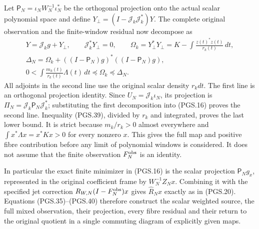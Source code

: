 Let \(\mathsf P_N=\iota_NW_N^{-1}\iota_N^*\) be the orthogonal
projection onto the actual scalar polynomial space and define
\(Y_\perp=(I-\mathscr J_k\mathscr J_k^*)Y\). The complete
original observation and the finite-window residual now decompose as
\[
\begin{gathered}
 Y=\mathscr J_kg+Y_\perp,\qquad
 \mathscr J_k^*Y_\perp=0,\qquad
 \Omega_k=Y_\perp^*Y_\perp
      =K-\int\frac{z(t)^*z(t)}{r_k(t)}\,dt,\\
 \Delta_N=\Omega_k+
       ((I-\mathsf P_N)g)^*((I-\mathsf P_N)g),\\
 0<\int\frac{m_k(t)}{r_k(t)}\Lambda(t)\,dt
                  \preceq\Omega_k\preceq\Delta_N.
\end{gathered}
\tag{PGS.40}\label{eq:pgs-fibre-residual}
\]
All adjoints in the second line use the original scalar density
\(r_kdt\). The first line is an orthogonal projection identity.
Since \(U_N=\mathscr J_k\iota_N\), its projection is
\(\Pi_N=\mathscr J_k\mathsf P_N\mathscr J_k^*\); substituting
the first decomposition into (PGS.16) proves the second line.
Inequality (PGS.39), divided by \(r_k\) and integrated, proves
the last lower bound. It is strict because \(m_k/r_k>0\)
almost everywhere and
\(\int x^*\Lambda x=x^*Kx>0\) for every nonzero \(x\).
This gives the full map and positive fibre contribution before any
limit of polynomial windows is considered. It does not assume that
the finite observation \(F_N^{\rm obs}\) is an identity.

In particular the exact finite minimizer in (PGS.16) is the scalar
projection \(\mathsf P_Ng_x\), represented in the original
coefficient frame by \(W_N^{-1}Z_Nx\). Combining it with the
specified jet correction \(R_{W,N}(I-F_N^{\rm obs})x\) gives
\(\widehat R_Nx\) exactly as in (PGS.20). Equations
(PGS.35)--(PGS.40) therefore construct the scalar weighted source,
the full mixed observation, their projection, every fibre residual
and their return to the original quotient in a single commuting
diagram of explicitly given maps.

